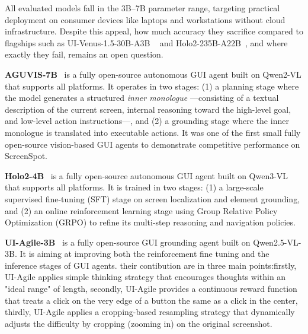 \documentclass{article}
\theoremstyle{plain}
\theoremstyle{definition}
\theoremstyle{remark}
\begin{document}
\noindent
All evaluated models fall in the 3B--7B parameter range, targeting practical deployment on consumer devices like laptops and workstations without cloud infrastructure. Despite this appeal, how much accuracy they sacrifice compared to flagships such as UI-Venus-1.5-30B-A3B ~\cite{uivenus15} and
Holo2-235B-A22B~\cite{holo2}, and where exactly they fail, remains an open question.

\textbf{AGUVIS-7B}~\cite{aguvis} is a fully open-source autonomous GUI agent built on Qwen2-VL that supports all platforms. It operates in two stages: (1) a planning stage where the model generates a structured \textit{inner monologue} ---consisting of a textual description of the current screen, internal reasoning toward the high-level goal, and low-level action instructions---, and (2) a grounding stage where the inner monologue is translated into executable actions. It was one of the first small fully open-source vision-based GUI agents to demonstrate competitive performance on ScreenSpot.

\textbf{Holo2-4B}~\cite{holo2} is a fully open-source autonomous GUI agent built on Qwen3-VL that supports all platforms. It is trained in two stages: (1) a large-scale supervised fine-tuning (SFT) stage on screen localization and element grounding, and (2) an online reinforcement learning stage using Group Relative Policy Optimization (GRPO) to refine its multi-step reasoning and navigation policies.

\textbf{UI-Agile-3B}~\cite{uiagile} is a fully open-source GUI grounding agent built on Qwen2.5-VL-3B. It is aiming at improving both the reinforcement fine tuning and the inference stages of GUI agents. their contibution are in three main points:firstly, UI-Agile applies simple thinking strategy that encourages thoughts within an "ideal range" of length, secondly, UI-Agile provides a continuous reward function that treats a click on the very edge of a button the same as a click in the center, thirdly, UI-Agile applies a cropping-based resampling strategy that dynamically adjusts the difficulty by cropping (zooming in) on the original screenshot.
\end{document}
